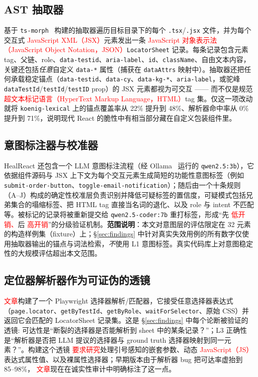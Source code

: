 \documentclass[UTF8, a4paper, 10.5pt, twocolumn, fontset=none]{ctexart}
\newcommand{\rev}[1]{\textcolor{red}{#1}} %
\providecommand{\DIFaddbegin}{} %
\providecommand{\DIFaddend}{} %
\providecommand{\DIFaddtex}[1]{\textcolor{red}{#1}} %
\providecommand{\DIFadd}[1]{\texorpdfstring{\DIFaddtex{#1}}{#1}} %
\providecommand{\DIFaddincludegraphics}[2][]{{\color{blue}\fbox{\DIFOincludegraphics[#1]{#2}}}} %
\DeclareRobustCommand{\DIFaddbegin}{\DIFOaddbegin \let\includegraphics\DIFaddincludegraphics} %
\DeclareRobustCommand{\DIFaddend}{\DIFOaddend \let\includegraphics\DIFOincludegraphics} %
\begin{document}
\subsection{AST 抽取器}
基于 \texttt{ts-morph}~\cite{tsmorph} 构建的抽取器遍历目标目录下的每个 \texttt{.tsx}/\texttt{.jsx} 文件，并为每个交互式  \DIFaddbegin \DIFadd{\rev{JavaScript XML（JSX）}}\DIFaddend 元素发出一条  \DIFaddbegin \DIFadd{\rev{JavaScript 对象表示法（JavaScript Object Notation，JSON）}}\DIFaddend \texttt{LocatorSheet} 记录。每条记录包含元素 tag、父链、role、\texttt{data-testid}、\texttt{aria-label}、\texttt{id}、\texttt{className}、自由文本内容，关键还包括\emph{任意}自定义 \texttt{data-*} 属性（捕获在 \texttt{dataAttrs} 映射中）。抽取器还把任何承载稳定锚点（\texttt{data-testid}、\texttt{data-cy}、\texttt{data-kg-*}、\texttt{aria-label}，或驼峰 \texttt{dataTestId}/\texttt{testId}/\texttt{testID} prop）的 JSX 元素都视为可交互 —— 而不仅是规范 \DIFaddbegin \DIFadd{\rev{超文本标记语言（HyperText Markup Language，HTML）}}\DIFaddend tag 集。仅这一项改动就将 \texttt{koenig-lexical} 上的锚点覆盖率从 22\% 提升到 48\%、解析器命中率从 0\% 提升到 71\%，说明现代 React 的脆性中有相当部分藏在自定义包装组件里。

\subsection{意图标注器与校准器}
HealReact 还包含一个 LLM 意图标注流程（经 Ollama~\cite{ollama} 运行的 \texttt{qwen2.5:3b}），它依据组件源码与 JSX 上下文为每个交互元素生成简短的功能性意图标签（例如 \texttt{submit-order-button}、\texttt{toggle-email-notification}）；随后由一个十条规则（A--J）构成的确定性校准层负责识别并降低可疑标签的置信度，可疑模式包括兄弟集合的塌缩标签、把 HTML tag 直接当名词的退化、以及 role 与 intent 不匹配等。被标记的记录将被重新提交给 \texttt{qwen2.5-coder:7b} 重打标签，形成“先 \DIFaddbegin \DIFadd{低开销、}\DIFaddend 后 \DIFaddbegin \DIFadd{高开销}\DIFaddend ”的分级验证机制。\textbf{范围说明}：本文对意图层的评估限定在 32 元素的构造样例集（fixture）上；\S\ref{sec:findings} 中针对真实失效用例的所有数字仅使用抽取器输出的锚点与词法检索，\emph{不}使用 L1 意图标签。真实代码库上对意图稳定性的大规模评估超出本文范围。

\subsection{定位器解析器作为可证伪的透镜}
 \DIFaddbegin \DIFadd{文章}\DIFaddend 构建了一个 Playwright 选择器解析/匹配器，它接受任意选择器表达式（\texttt{page.locator}、\texttt{getByTestId}、\texttt{getByRole}、\texttt{waitForSelector}、原始 CSS）并返回它会匹配的 LocatorSheet 记录集。这是 \S\ref{sec:findings} 中每个论断被验证的透镜: 可达性是“断裂的选择器是否能解析到 sheet 中的某条记录？”；L3 正确性是“解析器是否把 LLM 提议的选择器与 ground truth 选择器映射到同一元素？”。构建这个透镜 \DIFaddbegin \DIFadd{要求研究}\DIFaddend 处理引号感知的嵌套参数、动态  \DIFaddbegin \DIFadd{\rev{JavaScript（JS）}}\DIFaddend 表达式属性值、以及裸属性选择器；早期版本由于解析器 bug 把可达率虚抬到 85--98\%， \DIFaddbegin \DIFadd{文章}\DIFaddend 现在在诚实性审计中明确标注了这一点。
\end{document}
